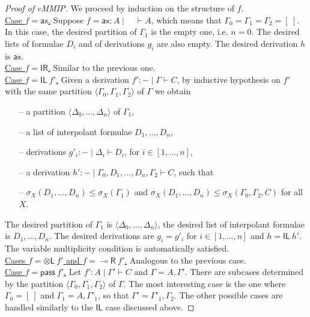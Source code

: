 \documentclass[sn-mathphys-num]{sn-jnl}%
\newcommand{\GG}{\Gamma}
\newcommand{\GD}{\Delta}
\newcommand{\vd}{\vdash}
\newcommand{\tl}{\otimes \mathsf{L}}
\newcommand{\pass}{\mathsf{pass}}
\newcommand{\unitl}{\mathsf{IL}}
\newcommand{\unitr}{\mathsf{IR}}
\newcommand{\ax}{\mathsf{ax}}
\newcommand{\lolli}{\multimap}
\newcommand{\lright}{{\lolli}\mathsf{R}}
\newcommand{\mf}[1]{\mathsf{#1}}
\newcommand{\gs}[1]{\sigma_{X} (#1)}
\newcommand{\vars}[1]{\mf{var} (#1)}
\newcommand{\cMMIP}{\textsf{cMMIP}}
\theoremstyle{thmstyleone}%
\theoremstyle{thmstyletwo}%
\theoremstyle{thmstylethree}%
\begin{document}
\begin{proof}[Proof of \cMMIP]
  We proceed by induction on the structure of $f$. 
  \\
  \underline{Case $f  = \ax$.}
  Suppose $f = \ax : A \mid \quad \vd A$, which means that $\GG_0 = \GG_1 = \GG_2 = [\ ]$.
  In this case, the desired partition of $\GG_1$ is the empty one, i.e. $n=0$. The desired lists of formulae $D_i$ and of derivations $g_i$ are also empty. The desired derivation $h$ is $\ax$.
  \\
  \underline{Case $f = \unitr$.} Similar to the previous one.
  \\
  \underline{Case $f = \unitl \ f'$.}
  Given a derivation $f' : {-} \mid \GG \vd C$, by inductive hypothesis on $f'$ with the same partition $\langle \GG_0, \GG_1, \GG_2 \rangle$ of $\GG$ we obtain  
  \begin{itemize}
    \item[--] a partition $\langle \GD_0, \dots , \GD_n \rangle$ of $\GG_1$, 
    \item[--] a list of interpolant formulae $D_1, \dots , D_n$,
    \item[--] derivations $g'_i : {-} \mid \GD_i \vd D_i$, for $i \in [1,\dots , n]$,
    \item[--] a derivation $h' : {-} \mid \GG_0 , D_1 , \dots , D_n , \GG_2 \vd C$, such that
    \item[--]  $\gs{D_1, \dots, D_n} \leq \gs{\GG_1}$ and $\gs{D_1, \dots, D_n}\leq \gs{\GG_0, \GG_2, C}$ for all $X$.
  \end{itemize}
  The desired partition of $\GG_1$ is $\langle \GD_0, \dots , \GD_n \rangle$, the desired list of interpolant formulae is $D_1,\dots,D_n$.
  The desired derivations are $g_i = g'_i$ for $i \in [1,\dots , n]$ and $h = \unitl \ h'$.
  The variable multiplicity condition is automatically satisfied.
  \\
  \underline{Cases $f = \tl \ f'$ and $f = \lright \ f'$.} Analogous to the previous case.
  \\
  \underline{Case $f = \pass \ f'$.}
  Let $f' : A \mid \GG' \vd C$ and $\GG = A,\GG'$. There are subcases determined by the partition $\langle \GG_0,\GG_1,\GG_2 \rangle$ of $\GG$.
  The most interesting case is the one where $\GG_0 = [\ ]$ and $\GG_1 = A,\GG'_1$, so that $\GG' = \GG'_1,\GG_2$. The other possible cases are handled similarly to the $\unitl$ case discussed above.

\end{proof}
\end{document}
